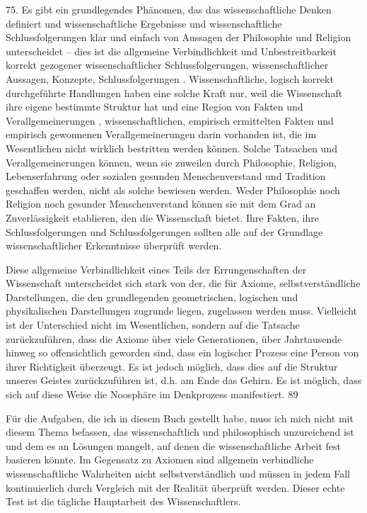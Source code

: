 \documentclass[11pt,a4paper]{book}
\begin{document}
75. Es gibt ein grundlegendes Phänomen, das das wissenschaftliche Denken definiert und wissenschaftliche Ergebnisse und wissenschaftliche Schlussfolgerungen klar und einfach von Aussagen der Philosophie und Religion unterscheidet -- dies ist die allgemeine Verbindlichkeit und Unbestreitbarkeit korrekt gezogener wissenschaftlicher Schlussfolgerungen, wissenschaftlicher Aussagen, Konzepte, Schlussfolgerungen . Wissenschaftliche, logisch korrekt durchgeführte Handlungen haben eine solche Kraft nur, weil die Wissenschaft ihre eigene bestimmte Struktur hat und eine Region von Fakten und Verallgemeinerungen , wissenschaftlichen, empirisch ermittelten Fakten und empirisch gewonnenen Verallgemeinerungen darin vorhanden ist, die im Wesentlichen nicht wirklich bestritten werden können. Solche Tatsachen und Verallgemeinerungen können, wenn sie zuweilen durch Philosophie, Religion, Lebenserfahrung oder sozialen gesunden Menschenverstand und Tradition geschaffen werden, nicht als solche bewiesen werden. Weder Philosophie noch Religion noch gesunder Menschenverstand können sie mit dem Grad an Zuverlässigkeit etablieren, den die Wissenschaft bietet. Ihre Fakten, ihre Schlussfolgerungen und Schlussfolgerungen sollten alle auf der Grundlage wissenschaftlicher Erkenntnisse überprüft werden.



Diese allgemeine Verbindlichkeit eines Teils der Errungenschaften der Wissenschaft unterscheidet sich stark von der, die für Axiome, selbstverständliche Darstellungen, die den grundlegenden geometrischen, logischen und physikalischen Darstellungen zugrunde liegen, zugelassen werden muss. Vielleicht ist der Unterschied nicht im Wesentlichen, sondern auf die Tatsache zurückzuführen, dass die Axiome über viele Generationen, über Jahrtausende hinweg so offensichtlich geworden sind, dass ein logischer Prozess eine Person von ihrer Richtigkeit überzeugt. Es ist jedoch möglich, dass dies auf die Struktur unseres Geistes zurückzuführen ist, d.h. am Ende das Gehirn. Es ist möglich, dass sich auf diese Weise die Noosphäre im Denkprozess manifestiert. 89



Für die Aufgaben, die ich in diesem Buch gestellt habe, muss ich mich nicht mit diesem Thema befassen, das wissenschaftlich und philosophisch unzureichend ist und dem es an Lösungen mangelt, auf denen die wissenschaftliche Arbeit fest basieren könnte. Im Gegensatz zu Axiomen sind allgemein verbindliche wissenschaftliche Wahrheiten nicht selbstverständlich und müssen in jedem Fall kontinuierlich durch Vergleich mit der Realität überprüft werden. Dieser echte Test ist die tägliche Hauptarbeit des Wissenschaftlers.
\end{document}
